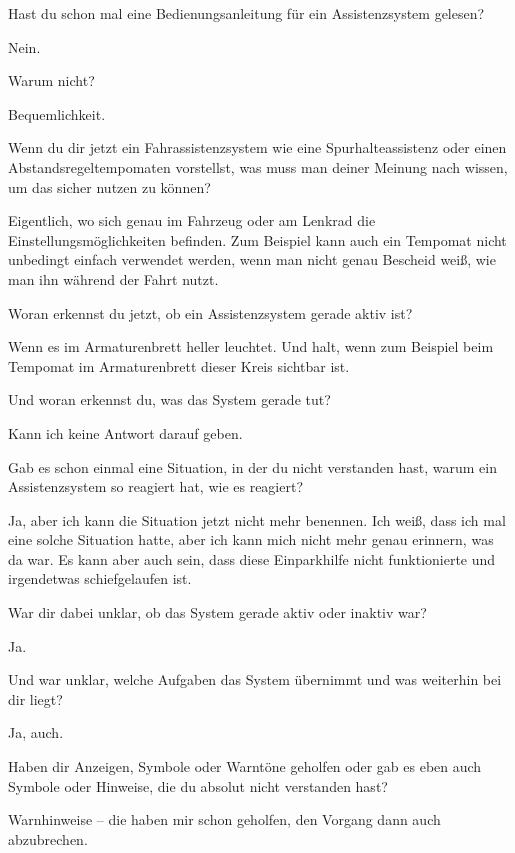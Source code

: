\interviewerin
Hast du schon mal eine Bedienungsanleitung für ein Assistenzsystem
gelesen?

Nein.

\interviewerin
Warum nicht?

Bequemlichkeit.

\interviewerin
Wenn du dir jetzt ein Fahrassistenzsystem wie eine Spurhalteassistenz
oder einen Abstandsregeltempomaten vorstellst, was muss man deiner
Meinung nach wissen, um das sicher nutzen zu können?

Eigentlich, wo sich genau im Fahrzeug oder am Lenkrad die
Einstellungsmöglichkeiten befinden. Zum Beispiel kann auch ein Tempomat
nicht unbedingt einfach verwendet werden, wenn man nicht genau Bescheid
weiß, wie man ihn während der Fahrt nutzt.

\interviewerin
Woran erkennst du jetzt, ob ein Assistenzsystem gerade aktiv ist?

Wenn es im Armaturenbrett heller leuchtet. Und halt, wenn zum Beispiel
beim Tempomat im Armaturenbrett dieser Kreis sichtbar ist.

\interviewerin
Und woran erkennst du, was das System gerade tut?

Kann ich keine Antwort darauf geben.

\interviewerin
Gab es schon einmal eine Situation, in der du nicht verstanden hast,
warum ein Assistenzsystem so reagiert hat, wie es reagiert?

Ja, aber ich kann die Situation jetzt nicht mehr benennen. Ich weiß,
dass ich mal eine solche Situation hatte, aber ich kann mich nicht mehr
genau erinnern, was da war. Es kann aber auch sein, dass diese
Einparkhilfe nicht funktionierte und irgendetwas schiefgelaufen ist.

\interviewerin
War dir dabei unklar, ob das System gerade aktiv oder inaktiv war?

Ja.

\interviewerin
Und war unklar, welche Aufgaben das System übernimmt und was weiterhin
bei dir liegt?

Ja, auch.

\interviewerin
Haben dir Anzeigen, Symbole oder Warntöne geholfen oder gab es eben
auch Symbole oder Hinweise, die du absolut nicht verstanden hast?

Warnhinweise – die haben mir schon geholfen, den Vorgang dann auch
abzubrechen.

